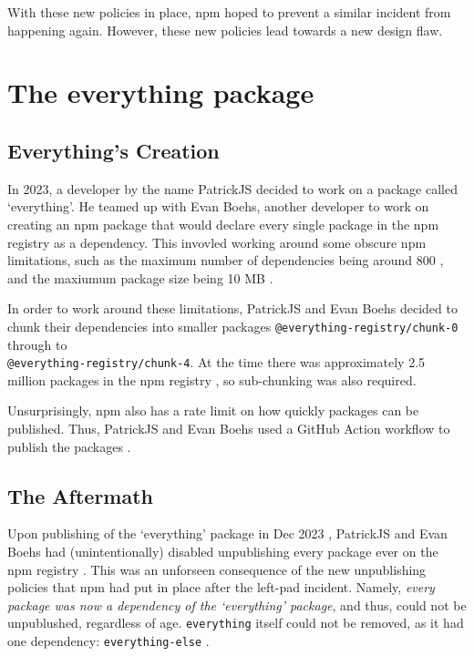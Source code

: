 \documentclass[acmsmall]{acmart}
\begin{document}
With these new policies in place, npm hoped to prevent a similar incident from happening again.
However, these new policies lead towards a new design flaw.

\section{The everything package}
\subsection{Everything's Creation}
In 2023, a developer by the name PatrickJS decided to work on a package called `everything'.
He teamed up with Evan Boehs, another developer to work on creating an npm package that
would declare every single package in the npm registry as a dependency. This invovled
working around some obscure npm limitations, such as the maximum number of dependencies
being around 800 \cite{youtube-everything}, and the maxiumum package size being 10 MB \cite{youtube-everything}.

In order to work around these limitations, PatrickJS and Evan Boehs decided to chunk their
dependencies into smaller packages \lstinline|@everything-registry/chunk-0| through to \\
\lstinline|@everything-registry/chunk-4|. At the time there was approximately 2.5 million
packages in the npm registry \cite{youtube-everything}, so sub-chunking was also required.

Unsurprisingly, npm also has a rate limit on how quickly packages can be published. Thus,
PatrickJS and Evan Boehs used a GitHub Action workflow to publish the packages \cite{youtube-everything}.

\subsection{The Aftermath}
Upon publishing of the `everything' package in Dec 2023 \cite{npm-everything},
PatrickJS and Evan Boehs had (unintentionally) disabled unpublishing every
package ever on the npm registry \cite{youtube-everything}. This was an
unforseen consequence of the new unpublishing policies that npm had put in place
after the left-pad incident. Namely, \textit{every package was now a dependency
  of the `everything' package}, and thus, could not be unpublushed, regardless of
age. \lstinline|everything| itself could not be removed, as it had one
dependency: \lstinline|everything-else| \cite{npm-everything-else}.
\end{document}
